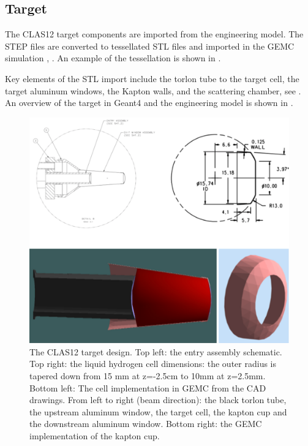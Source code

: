 \subsection{Target}

The CLAS12 target components are imported from the engineering model. The STEP files are converted to tessellated STL files and imported
in the GEMC simulation \cite{targetCorrection}, \cite{targetStudy}. An example of the tessellation is shown in .

Key elements of the STL import include the torlon tube to the target cell,
the target aluminum windows, the Kapton walls, and the scattering chamber, see .
An overview of the target in Geant4 and the engineering model is shown in .

\begin{figure}
	\centering
	\includegraphics[width=0.95\columnwidth,keepaspectratio]{img/targetDesign.png}
	\caption{The CLAS12 target design. Top left: the entry assembly schematic. Top right: the liquid hydrogen cell
            dimensions: the outer radius is tapered down from 15 mm at z=-2.5cm to 10mm at z=2.5mm.
            Bottom left: The cell implementation in GEMC from the CAD drawings. From left to right (beam direction):
            the black torlon tube, the upstream aluminum window, the target cell, the kapton cup and the
				downstream aluminum window. Bottom right: the GEMC implementation of the kapton cup.}
	\label{fig:targetDesign}
\end{figure}


